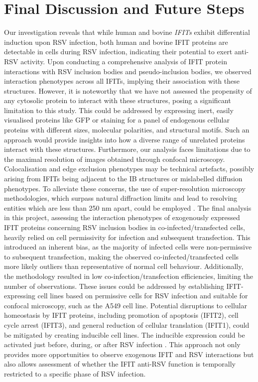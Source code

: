 \chapter{Final Discussion and Future Steps} \label{ch:Final Discussion and Future Steps}
Our investigation reveals that while human and bovine \textit{IFITs} exhibit differential induction upon RSV infection, both human and bovine IFIT proteins are detectable in cells during RSV infection, indicating their potential to exert anti-RSV activity. Upon conducting a comprehensive analysis of IFIT protein interactions with RSV inclusion bodies and pseudo-inclusion bodies, we observed interaction phenotypes across all IFITs, implying their association with these structures. However, it is noteworthy that we have not assessed the propensity of any cytosolic protein to interact with these structures, posing a significant limitation to this study. This could be addressed by expressing inert, easily visualised proteins like GFP or staining for a panel of endogenous cellular proteins with different sizes, molecular polarities, and structural motifs. Such an approach would provide insights into how a diverse range of unrelated proteins interact with these structures. Furthermore, our analysis faces limitations due to the maximal resolution of images obtained through confocal microscopy. Colocalisation and edge exclusion phenotypes may be technical artefacts, possibly arising from IFITs being adjacent to the IB structures or mislabelled diffusion phenotypes. To alleviate these concerns, the use of super-resolution microscopy methodologies, which surpass natural diffraction limits and lead to resolving entities which are less than 250 nm apart, could be employed \cite{Schermelleh2019Super-resolutionDemystified}. The final analysis in this project, assessing the interaction phenotypes of exogenously expressed IFIT proteins concerning RSV inclusion bodies in co-infected/transfected cells, heavily relied on cell permissivity for infection and subsequent transfection. This introduced an inherent bias, as the majority of infected cells were non-permissive to subsequent transfection, making the observed co-infected/transfected cells more likely outliers than representative of normal cell behaviour. Additionally, the methodology resulted in low co-infection/transfection efficiencies, limiting the number of observations. These issues could be addressed by establishing IFIT-expressing cell lines based on permissive cells for RSV infection and suitable for confocal microscopy, such as the A549 cell line. Potential disruptions to cellular homeostasis by IFIT proteins, including promotion of apoptosis (IFIT2), cell cycle arrest (IFIT3), and general reduction of cellular translation (IFIT1), could be mitigated by creating inducible cell lines. The inducible expression could be activated just before, during, or after RSV infection \cite{Kallunki2019HowStudies}. This approach not only provides more opportunities to observe exogenous IFIT and RSV interactions but also allows assessment of whether the IFIT anti-RSV function is temporally restricted to a specific phase of RSV infection.

